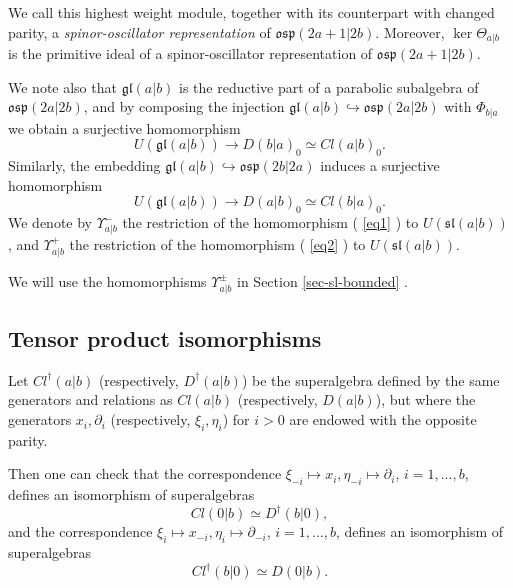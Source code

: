 \documentclass[12pt]{amsart}
\makeatletter
\def\@putname#1#2#3#4{\def\@@ref{#3}\let\old@bf\bf
        \def\bf##1{\old@bf\if?\noexpand##1?{#4}\else##1\fi}%
	#1{#2}%
        \let\bf\old@bf}
\def\@putname#1#2#3#4{\def\@@ref{#3}\let\old@bf\bf	%
	\let\old@reset@font\reset@font			%
        \def\bf##1{\old@bf\if?\noexpand##1?{#4}\else##1\fi}%
	\def\reset@font##1##2{\old@reset@font##1\if?\noexpand##2?{#4}\else##2\fi}#1{#2}%
        \let\bf\old@bf\let\reset@font\old@reset@font}
\let\my@ref=\ref
\def\ref#1{\@putname\my@ref{#1}{#1}{\tiny\rm\@@ref}}
\theoremstyle{plain} %
\numberwithin{equation}{section}
\theoremstyle{definition}
\theoremstyle{remark}
\theoremstyle{plain} %
\newcommand{\osp}{\mathfrak{osp}}
\newcommand{\ggl}{\mathfrak{gl}}
\makeatother
\begin{document}
  We call this highest weight module, together with its counterpart with changed parity, a \emph{spinor-oscillator representation} of $\osp(2a+1|2b)$. Moreover, $\ker\Theta_{a|b}$ is the primitive ideal of a spinor-oscillator representation of $\osp(2a+1|2b)$.
    
  


      We note also that $\ggl(a|b)$ is the reductive part of a parabolic subalgebra of $\osp(2a|2b)$, and by composing {the injection} $\ggl(a|b)\hookrightarrow \osp(2a|2b)$ with $\Phi_{b|a}$ we  obtain a surjective homomorphism
      \begin{equation}\label{eq1} U(\ggl(a|b))\to D(b|a)_0\simeq Cl(a|b)_{0}.
        \end{equation}
        Similarly, the embedding $\ggl(a|b)\hookrightarrow\osp(2b|2a)$ induces a surjective homomorphism
\begin{equation}\label{eq2}
  U(\ggl(a|b))\to D(a|b)_0\simeq Cl(b|a)_{0}.
\end{equation}
We denote by $\Upsilon^-_{a|b}$ the restriction of the homomorphism (\ref{eq1}) to $U(\mathfrak{sl}(a|b))$, and  $\Upsilon^+_{a|b}$ the
restriction of the homomorphism (\ref{eq2}) to $U(\mathfrak{sl}(a|b))$.
      
      We will use the homomorphisms $\Upsilon^\pm_{a|b}$  in Section \ref{sec-sl-bounded}. 
      
      
           \subsection{Tensor product isomorphisms}      
           Let $Cl^\dagger(a|b)$ (respectively, $D^\dagger(a|b)$) be the superalgebra defined by the same generators and relations as $Cl(a|b)$  (respectively, $D(a|b)$), but where the generators $x_i, \partial_i$ (respectively, $\xi_i, \eta_i$) for $i>0$ are endowed with  the opposite parity. 
                      
           Then one can check  that the correspondence $\xi_{-i} \mapsto x_i, \eta_{-i} \mapsto \partial_i$, $i=1,...,b$, defines an isomorphism of superalgebras
           \begin{equation}\label{D-iso}
             Cl(0|b)\simeq D^\dagger(b|0),
           \end{equation}
           and the correspondence $\xi_{i} \mapsto x_{-i}, \eta_{i} \mapsto \partial_{-i}$, $i=1,...,b$, defines an isomorphism of superalgebras
       \begin{equation}\label{Cl-iso}    
         Cl^\dagger(b|0)\simeq D(0|b).
         \end{equation}
      
\end{document}
